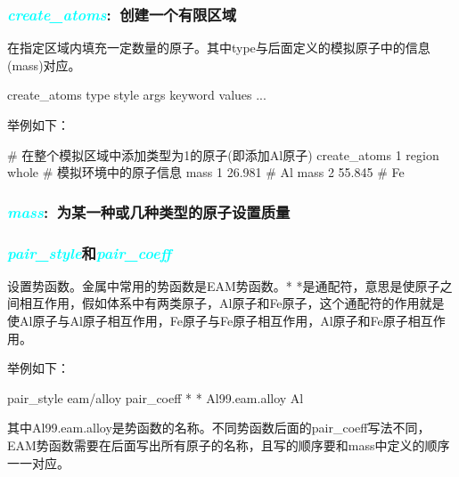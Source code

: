 \frame
{
	\frametitle{\textcolor{cyan}{\textit{create\_atoms}}:~创建一个有限区域}
	在指定区域内填充一定数量的原子。其中type与后面定义的模拟原子中的信息(mass)对应。

create_atoms type style args keyword values ...

举例如下：

# 在整个模拟区域中添加类型为1的原子(即添加Al原子)
create_atoms 1 region whole
# 模拟环境中的原子信息
mass 1 26.981   # Al
mass 2 55.845   # Fe
}

\frame
{
	\frametitle{\textcolor{cyan}{\textit{mass}}:~为某一种或几种类型的原子设置质量}
}

\frame
{
	\frametitle{\textcolor{cyan}{\textit{pair\_style}}和\textcolor{cyan}{\textit{pair\_coeff}}}
	设置势函数。金属中常用的势函数是EAM势函数。* *是通配符，意思是使原子之间相互作用，假如体系中有两类原子，Al原子和Fe原子，这个通配符的作用就是使Al原子与Al原子相互作用，Fe原子与Fe原子相互作用，Al原子和Fe原子相互作用。

举例如下：

pair_style	eam/alloy
pair_coeff	* * Al99.eam.alloy Al

其中Al99.eam.alloy是势函数的名称。不同势函数后面的pair_coeff写法不同，EAM势函数需要在后面写出所有原子的名称，且写的顺序要和mass中定义的顺序一一对应。
}

